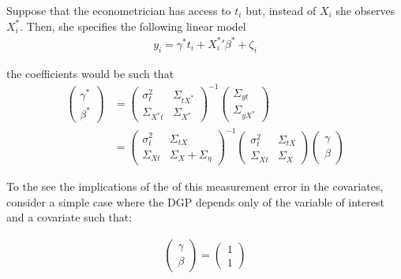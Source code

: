 \documentclass[12pt]{article}
\begin{document}
        Suppose that the econometrician has access to $t_i$ but, instead of $X_i$ she observes $X^*_i$. Then, she specifies the following linear model
        \begin{align}
            y_i = \gamma^* t_i + {X^{*}_i}' \beta^* + \zeta_i
        \end{align}

        the coefficients would be such that
        \begin{align}
            \left(\begin{array}{l}
        {\gamma}^* \\
        {\beta}^*
        \end{array}\right)&=\left(\begin{array}{cc}
        {\sigma}^2_{t} & \Sigma_{tX^*} \\
        \Sigma_{X^*t} & {\Sigma}_{X^*}
        \end{array}\right)^{-1}\left(\begin{array}{c}
        \Sigma_{yt} \\
        \Sigma_{yX^*}
        \end{array}\right) \\
        & =\left(\begin{array}{cc}
        {\sigma}^2_{t} & \Sigma_{tX} \\
        \Sigma_{Xt} & {\Sigma}_{X}+{\Sigma}_{\eta}
        \end{array}\right)^{-1}\left(\begin{array}{cc}
        {\sigma}^2_{t} & \Sigma_{tX} \\
        \Sigma_{Xt} & {\Sigma}_{X}
        \end{array}\right)\left(\begin{array}{l}
        {\gamma} \\
        {\beta}
        \end{array}\right)
        \end{align}

        To the see the implications of the of this measurement error in the covariates, consider a simple case where the DGP depends only of the variable of interest and a covariate such that:

        \begin{align}
            \left(\begin{array}{l}
        {\gamma} \\
        {\beta}
        \end{array}\right)=\left(\begin{array}{l}
        1 \\
        1
        \end{array}\right)
        \end{align}
\end{document}
